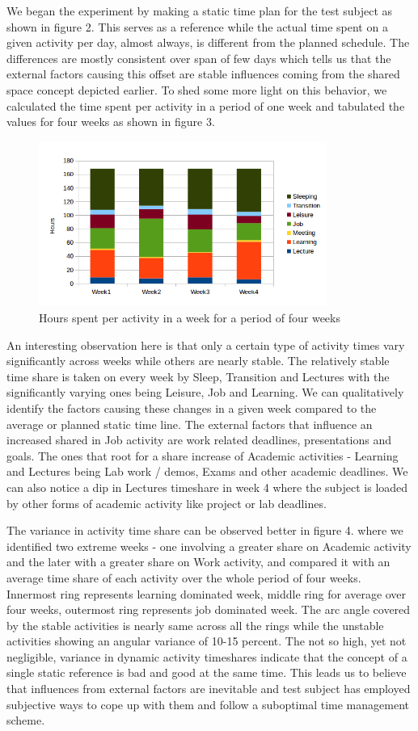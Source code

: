 \documentclass[conference]{IEEEtran}
\begin{document}
We began the experiment by making a static time plan for the test subject as shown in figure 2. This serves as a reference while the actual time spent on a given activity per day, almost always, is different from the planned schedule. The differences are mostly consistent over span of few days which tells us that the external factors causing this offset are stable influences coming from the shared space concept depicted earlier. To shed some more light on this behavior, we calculated the time spent per activity in a period of one week and tabulated the values for four weeks as shown in figure 3. 

\begin{figure}[hb]
  \centering
  \includegraphics[width=3.7in]{bar}
  \caption[]
   {Hours spent per activity in a week for a period of four weeks}
\end{figure}

An interesting observation here is that only a certain type of activity times vary significantly across weeks while others are nearly stable. The relatively stable time share is taken on every week by Sleep, Transition and Lectures with the significantly varying ones being Leisure, Job and Learning. We can qualitatively identify the factors causing these changes in a given week compared to the average or planned static time line. The external factors that influence an increased shared in Job activity are work related deadlines, presentations and goals. The ones that root for a share increase of Academic activities - Learning and Lectures being Lab work / demos, Exams and other academic deadlines. We can also notice a dip in Lectures timeshare in week 4 where the subject is loaded by other forms of academic activity like project or lab deadlines. 

The variance in activity time share can be observed better in figure 4. where we identified two extreme weeks - one involving a greater share on Academic activity and the later with a greater share on Work activity, and compared it with an average time share of each activity over the whole period of four weeks. Innermost ring represents learning dominated week, middle ring for average over four weeks, outermost ring represents job dominated week. The arc angle covered by the stable activities is nearly same across all the rings while the unstable activities showing an angular variance of 10-15 percent. The not so high, yet not negligible, variance in dynamic activity timeshares indicate that the concept of a single static reference is bad and good at the same time. This leads us to believe that influences from external factors are inevitable and test subject has employed subjective ways to cope up with them and follow a suboptimal time management scheme.
\end{document}
